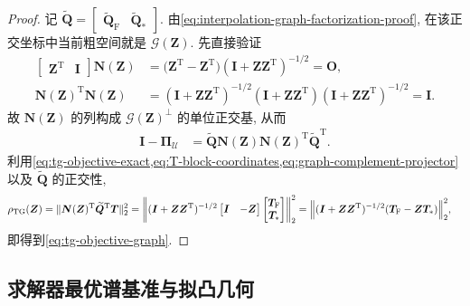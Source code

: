 \documentclass{ctexart}
\newcommand{\T}{\mathrm{T}}
\newcommand{\ti}[1]{\widetilde{#1}}
\DeclarePairedDelimiter\norm{\lVert}{\rVert}
\begin{document}
\begin{proof}
记 $\ti{\bm Q}=\begin{bmatrix}\ti{\bm Q}_{\mathrm F}&\ti{\bm Q}_\ast\end{bmatrix}$. 由\cref{eq:interpolation-graph-factorization-proof}, 在该正交坐标中当前粗空间就是 $\mathcal G(\bm Z)$. 先直接验证
\begin{align}
    \begin{bmatrix}\bm Z^\T&\bm I\end{bmatrix}\bm N(\bm Z)
    &=\bigl(\bm Z^\T-\bm Z^\T\bigr)
      (\bm I+\bm Z\bm Z^\T)^{-1/2}
     =\mathbf O,
    \label{eq:graph-complement-orthogonality}\\
    \bm N(\bm Z)^\T\bm N(\bm Z)
    &=(\bm I+\bm Z\bm Z^\T)^{-1/2}
      (\bm I+\bm Z\bm Z^\T)
      (\bm I+\bm Z\bm Z^\T)^{-1/2}
     =\bm I.
    \label{eq:graph-complement-normalization}
\end{align}
故 $\bm N(\bm Z)$ 的列构成 $\mathcal G(\bm Z)^\perp$ 的单位正交基, 从而
\begin{align}
    \bm I-\bm\Pi_{\mathcal U}
    &=\ti{\bm Q}\bm N(\bm Z)\bm N(\bm Z)^\T\ti{\bm Q}^\T.
    \label{eq:graph-complement-projector}
\end{align}
利用\cref{eq:tg-objective-exact,eq:T-block-coordinates,eq:graph-complement-projector} 以及 $\ti{\bm Q}$ 的正交性,
\begin{align}
    \rho_{\mathrm{TG}}(\bm Z)
    &=\norm{\bm N(\bm Z)^\T\ti{\bm Q}^\T\bm T}_2^2=\norm*{
        (\bm I+\bm Z\bm Z^\T)^{-1/2}
        \begin{bmatrix}\bm I&-\bm Z\end{bmatrix}
        \begin{bmatrix}\bm T_{\mathrm F}\\\bm T_\ast\end{bmatrix}
      }_2^2=\norm*{
        (\bm I+\bm Z\bm Z^\T)^{-1/2}
        (\bm T_{\mathrm F}-\bm Z\bm T_\ast)
      }_2^2,
    \label{eq:tg-objective-coordinate-projection}
\end{align}
即得到\cref{eq:tg-objective-graph}.
\end{proof}


\subsection{求解器最优谱基准与拟凸几何}
\label{sec:solver-optimal-geometry}
\end{document}
